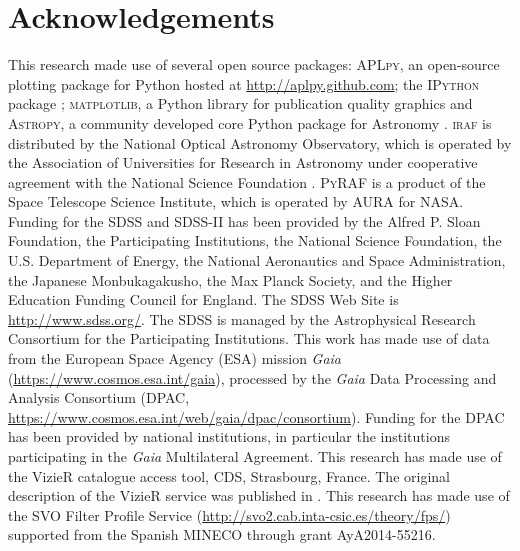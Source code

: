 \documentclass[apj, revtex4]{emulateapj}
\begin{document}
\section*{Acknowledgements}
This research made use of several open source packages: \textsc{APLpy}, an open-source plotting package for Python hosted at \url{http://aplpy.github.com}; the \textsc{IPython} package \citep{Perez2007}; \textsc{matplotlib}, a Python library for publication quality graphics \citep{Hunter2007} and \textsc{Astropy}, a community developed core Python package for Astronomy \citep{TheAstropyCollaboration2013}.
\textsc{iraf} is distributed by the National Optical Astronomy Observatory, which is operated by the Association of Universities for Research in Astronomy under cooperative agreement with the National Science Foundation \citep{Tody1993}.
\textsc{PyRAF} is a product of the Space Telescope Science Institute, which is operated by AURA for NASA.
Funding for the SDSS and SDSS-II has been provided by the Alfred P. Sloan Foundation, the Participating Institutions, the National Science Foundation, the U.S. Department of Energy, the National Aeronautics and Space Administration, the Japanese Monbukagakusho, the Max Planck Society, and the Higher Education Funding Council for England. The SDSS Web Site is \url{http://www.sdss.org/}. The SDSS is managed by the Astrophysical Research Consortium for the Participating Institutions.
This work has made use of data from the European Space Agency (ESA) mission {\it Gaia} (\url{https://www.cosmos.esa.int/gaia}), processed by the {\it Gaia} Data Processing and Analysis Consortium (DPAC, \url{https://www.cosmos.esa.int/web/gaia/dpac/consortium}). Funding for the DPAC has been provided by national institutions, in particular the institutions participating in the {\it Gaia} Multilateral Agreement.
This research has made use of the VizieR catalogue access tool, CDS, Strasbourg, France. The original description of the VizieR service was published in \cite{Ochsenbein2000}.
This research has made use of the SVO Filter Profile Service (\url{http://svo2.cab.inta-csic.es/theory/fps/}) supported from the Spanish MINECO through grant AyA2014-55216.




\end{document}
